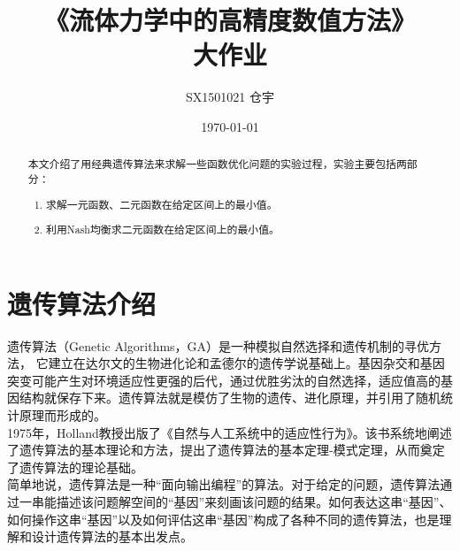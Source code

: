 \documentclass[UTF8]{ctexart}
\title{\heiti 《流体力学中的高精度数值方法》 \\ 大作业}
\author{SX1501021 仓宇}
\date{\today}
\begin{document}
\maketitle
\setcounter{page}{0}
\thispagestyle{empty}

\clearpage

\begin{abstract}
本文介绍了用经典遗传算法来求解一些函数优化问题的实验过程，实验主要包括两部分：
\begin{enumerate}[(1)]
\item 求解一元函数、二元函数在给定区间上的最小值。
\item 利用Nash均衡求二元函数在给定区间上的最小值。
\end{enumerate}
\end{abstract}

\clearpage

\tableofcontents

\clearpage

\section{遗传算法介绍}
遗传算法（Genetic Algorithms，GA）是一种模拟自然选择和遗传机制的寻优方法， 它建立在达尔文的生物进化论和孟德尔的遗传学说基础上。基因杂交和基因突变可能产生对环境适应性更强的后代，通过优胜劣汰的自然选择，适应值高的基因结构就保存下来。遗传算法就是模仿了生物的遗传、进化原理，并引用了随机统计原理而形成的。\\
\indent 1975年，Holland教授出版了《自然与人工系统中的适应性行为》。该书系统地阐述了遗传算法的基本理论和方法，提出了遗传算法的基本定理-模式定理，从而奠定了遗传算法的理论基础。\\
\indent 简单地说，遗传算法是一种“面向输出编程”的算法。对于给定的问题，遗传算法通过一串能描述该问题解空间的“基因”来刻画该问题的结果。如何表达这串“基因”、如何操作这串“基因”以及如何评估这串“基因”构成了各种不同的遗传算法，也是理解和设计遗传算法的基本出发点。\\
\end{document}
